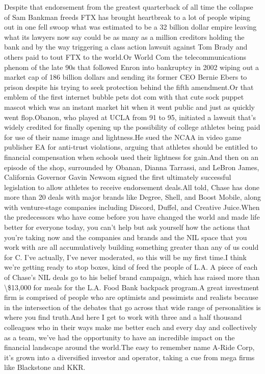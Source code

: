 \documentclass{article}%
\begin{document}
Despite that endorsement from the greatest quarterback of all time the collapse of Sam Bankman freeds FTX has brought heartbreak to a lot of people wiping out in one fell swoop what was estimated to be a 32 billion dollar empire leaving what its lawyers now say could be as many as a million creditors holding the bank and by the way triggering a class action lawsuit against Tom Brady and others paid to tout FTX to the world.Or World Com the telecommunications phenom of the late 90s that followed Enron into bankruptcy in 2002 wiping out a market cap of 186 billion dollars and sending its former CEO Bernie Ebers to prison despite his trying to seek protection behind the fifth amendment.Or that emblem of the first internet bubble pets dot com with that cute sock puppet mascot which was an instant market hit when it went public and just as quickly went flop.Obanon, who played at UCLA from 91 to 95, initiated a lawsuit that's widely credited for finally opening up the possibility of college athletes being paid for use of their name image and lightness.He sued the NCAA in video game publisher EA for anti{-}trust violations, arguing that athletes should be entitled to financial compensation when schools used their lightness for gain.And then on an episode of the shop, surrounded by Obanan, Dianna Tarrassi, and LeBron James, California Governor Gavin Newsom signed the first ultimately successful legislation to allow athletes to receive endorsement deals.All told, Chase has done more than 20 deals with major brands like Degree, Shell, and Boost Mobile, along with venture{-}stage companies including Discord, Duffel, and Creative Juice.When the predecessors who have come before you have changed the world and made life better for everyone today, you can't help but ask yourself how the actions that you're taking now and the companies and brands and the NIL space that you work with are all accumulatively building something greater than any of us could for C. I've actually, I've never moderated, so this will be my first time.I think we're getting ready to stop boxes, kind of feed the people of L.A. A piece of each of Chase's NIL deals go to his belief brand campaign, which has raised more than \textbackslash{}\$13,000 for meals for the L.A. Food Bank backpack program.A great investment firm is comprised of people who are optimists and pessimists and realists because in the intersection of the debates that go across that wide range of personalities is where you find truth.And here I get to work with three and a half thousand colleagues who in their ways make me better each and every day and collectively as a team, we've had the opportunity to have an incredible impact on the financial landscape around the world.The easy to remember name A{-}Ride Corp, it's grown into a diversified investor and operator, taking a cue from mega firms like Blackstone and KKR.%
\end{document}
